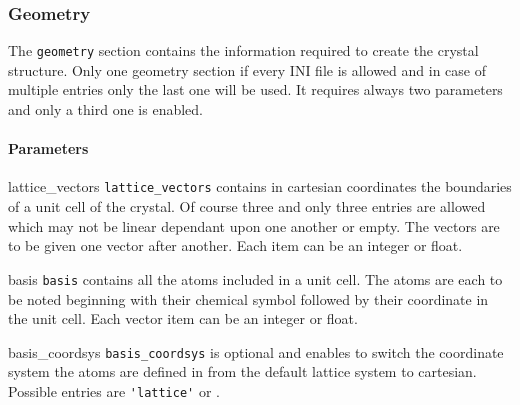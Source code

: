 \subsubsection{Geometry}
The \lstinline{geometry} section contains the information required to create the crystal structure. Only one geometry section if every INI file is allowed and in case of multiple entries only the last one will be used. It requires always two parameters and only a third one is enabled.
\paragraph{Parameters}
\begin{description}
 \item{lattice_vectors} \lstinline{lattice_vectors} contains in cartesian coordinates the boundaries of a unit cell of the crystal. Of course three and only three entries are allowed which may not be linear dependant upon one another or empty. The vectors are to be given one vector after another. Each item can be an integer or float.
 \item{basis} \lstinline{basis} contains all the atoms included in a unit cell. The atoms are each to be noted beginning with their chemical symbol followed by their coordinate in the unit cell. Each vector item can be an integer or float.
 \item{basis_coordsys} \lstinline{basis_coordsys} is optional and enables to switch the coordinate system the atoms are defined in from the default lattice system to cartesian. Possible entries are \lstinline{'lattice'} or . 
\end{description}


